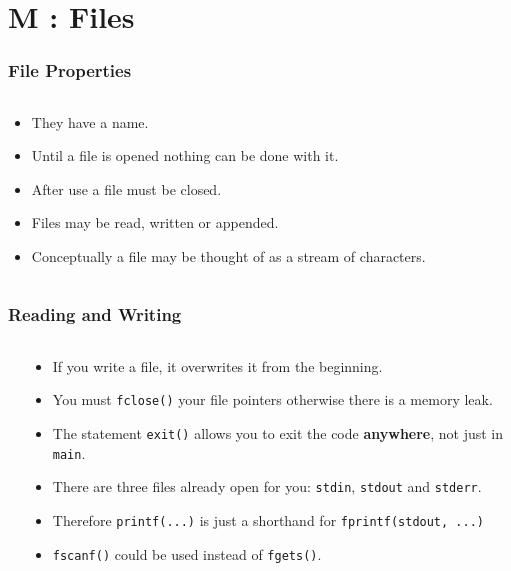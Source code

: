 \section{M : Files}
\label{chap:files}


\begin{frame}[fragile]
\frametitle{File Properties}
\begin{columns}[T]


\begin{column}{0.55\textwidth}
\begin{itemize}[<+->]
\item They have a name.
\item Until a file is opened nothing can be done with it.
\item After use a file must be closed.
\item Files may be read, written or appended.
\item Conceptually a file may be thought of as a stream of characters.
\end{itemize}
\end{column}

\pause
\begin{column}{0.35\textwidth}

\end{column}

\end{columns}
\end{frame}


\begin{frame}[fragile]
\frametitle{Reading and Writing}
\begin{columns}[T]

\begin{column}{0.50\textwidth}

\end{column}

\pause
\begin{column}{0.40\textwidth}
\begin{itemize}[<+->]
\item If you write a file, it overwrites it from the beginning.
\item You must \verb^fclose()^ your file pointers otherwise there is a memory leak.
\item The statement \verb^exit()^ allows you to exit the code {\bf anywhere}, not just in \verb^main^.
\item There are three files already open for you: \verb^stdin^, \verb^stdout^ and \verb^stderr^.
\item Therefore \verb^printf(...)^ is just a shorthand for \verb^fprintf(stdout, ...)^
\item \verb^fscanf()^ could be used instead of \verb^fgets()^.
\end{itemize}
\end{column}


\end{columns}
\end{frame}

